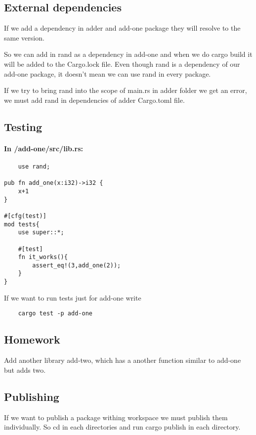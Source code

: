 \subsection{External dependencies}

If we add a dependency in adder and add-one package they will resolve to the same version.

So we can add in rand as a dependency in add-one and when we do cargo build it will be added to the Cargo.lock file. Even though rand is a dependency of our add-one package, it doesn't mean we can use rand in every package.

If we try to bring rand into the scope of main.rs in adder folder we get an error, we must add rand in dependencies of adder Cargo.toml file.

\subsection{Testing}

\paragraph*{In /add-one/src/lib.rs:}\begin{lstlisting}
    use rand;

pub fn add_one(x:i32)->i32 {
    x+1
}

#[cfg(test)]
mod tests{
    use super::*;

    #[test]
    fn it_works(){
        assert_eq!(3,add_one(2));
    }
}
\end{lstlisting}

If we want to run tests just for add-one write \begin{lstlisting}
    cargo test -p add-one
\end{lstlisting}

\subsection{Homework}
Add another library add-two, which has a another function similar to add-one but adds two.

\subsection{Publishing}

If we want to publish a package withing workspace we must publish them individually. So cd in each directories and run cargo publish in each directory.

